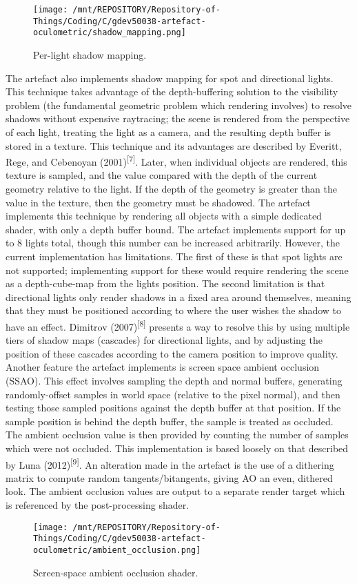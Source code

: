 \documentclass[
]{article}
\begin{document}
{\begin{figure}[H]
\texttt{[image: /mnt/REPOSITORY/Repository-of-Things/Coding/C/gdev50038-artefact-oculometric/shadow\_mapping.png]}
\caption{\label{fig:figure2} Per-light shadow mapping.}
\end{figure}
The artefact also implements shadow mapping for spot and directional
lights. This technique takes advantage of the depth-buffering solution
to the visibility problem (the fundamental geometric problem which
rendering involves) to resolve shadows without expensive raytracing; the
scene is rendered from the perspective of each light, treating the light
as a camera, and the resulting depth buffer is stored in a texture. This
technique and its advantages are described by Everitt, Rege, and
Cebenoyan (2001)\textsuperscript{{[}7{]}}. Later, when individual
objects are rendered, this texture is sampled, and the value compared
with the depth of the current geometry relative to the light. If the
depth of the geometry is greater than the value in the texture, then the
geometry must be shadowed. The artefact implements this technique by
rendering all objects with a simple dedicated shader, with only a depth
buffer bound. The artefact implements support for up to 8 lights total,
though this number can be increased arbitrarily. However, the current
implementation has limitations. The first of these is that spot lights
are not supported; implementing support for these would require
rendering the scene as a depth-cube-map from the light\textquotesingle s
position. The second limitation is that directional lights only render
shadows in a fixed area around themselves, meaning that they must be
positioned according to where the user wishes the shadow to have an
effect. Dimitrov (2007)\textsuperscript{{[}8{]}} presents a way to
resolve this by using multiple tiers of shadow maps (cascades) for
directional lights, and by adjusting the position of these cascades
according to the camera position to improve quality.\\

Another feature the artefact implements is screen space ambient
occlusion (SSAO). This effect involves sampling the depth and normal
buffers, generating randomly-offset samples in world space (relative to
the pixel normal), and then testing those sampled positions against the
depth buffer at that position. If the sample position is behind the
depth buffer, the sample is treated as occluded. The ambient occlusion
value is then provided by counting the number of samples which were not
occluded. This implementation is based loosely on that described by Luna
(2012)\textsuperscript{{[}9{]}}. An alteration made in the artefact is
the use of a dithering matrix to compute random tangents/bitangents,
giving AO an even, dithered look. The ambient occlusion values are
output to a separate render target which is referenced by the
post-processing shader.\\
\begin{figure}[H]
\texttt{[image: /mnt/REPOSITORY/Repository-of-Things/Coding/C/gdev50038-artefact-oculometric/ambient\_occlusion.png]}
\caption{\label{fig:figure3} Screen-space ambient occlusion shader.}
\end{figure}

}
\end{document}
